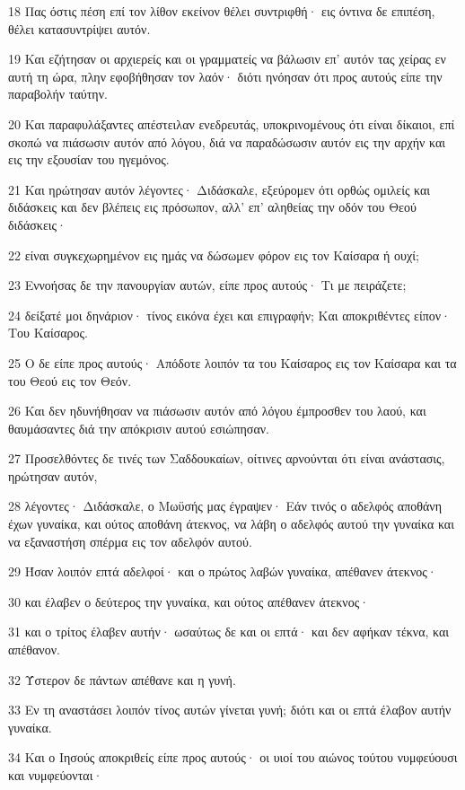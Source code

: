 \par 18 Πας όστις πέση επί τον λίθον εκείνον θέλει συντριφθή· εις όντινα δε επιπέση, θέλει κατασυντρίψει αυτόν.
\par 19 Και εζήτησαν οι αρχιερείς και οι γραμματείς να βάλωσιν επ' αυτόν τας χείρας εν αυτή τη ώρα, πλην εφοβήθησαν τον λαόν· διότι ηνόησαν ότι προς αυτούς είπε την παραβολήν ταύτην.
\par 20 Και παραφυλάξαντες απέστειλαν ενεδρευτάς, υποκρινομένους ότι είναι δίκαιοι, επί σκοπώ να πιάσωσιν αυτόν από λόγου, διά να παραδώσωσιν αυτόν εις την αρχήν και εις την εξουσίαν του ηγεμόνος.
\par 21 Και ηρώτησαν αυτόν λέγοντες· Διδάσκαλε, εξεύρομεν ότι ορθώς ομιλείς και διδάσκεις και δεν βλέπεις εις πρόσωπον, αλλ' επ' αληθείας την οδόν του Θεού διδάσκεις·
\par 22 είναι συγκεχωρημένον εις ημάς να δώσωμεν φόρον εις τον Καίσαρα ή ουχί;
\par 23 Εννοήσας δε την πανουργίαν αυτών, είπε προς αυτούς· Τι με πειράζετε;
\par 24 δείξατέ μοι δηνάριον· τίνος εικόνα έχει και επιγραφήν; Και αποκριθέντες είπον· Του Καίσαρος.
\par 25 Ο δε είπε προς αυτούς· Απόδοτε λοιπόν τα του Καίσαρος εις τον Καίσαρα και τα του Θεού εις τον Θεόν.
\par 26 Και δεν ηδυνήθησαν να πιάσωσιν αυτόν από λόγου έμπροσθεν του λαού, και θαυμάσαντες διά την απόκρισιν αυτού εσιώπησαν.
\par 27 Προσελθόντες δε τινές των Σαδδουκαίων, οίτινες αρνούνται ότι είναι ανάστασις, ηρώτησαν αυτόν,
\par 28 λέγοντες· Διδάσκαλε, ο Μωϋσής μας έγραψεν· Εάν τινός ο αδελφός αποθάνη έχων γυναίκα, και ούτος αποθάνη άτεκνος, να λάβη ο αδελφός αυτού την γυναίκα και να εξαναστήση σπέρμα εις τον αδελφόν αυτού.
\par 29 Ήσαν λοιπόν επτά αδελφοί· και ο πρώτος λαβών γυναίκα, απέθανεν άτεκνος·
\par 30 και έλαβεν ο δεύτερος την γυναίκα, και ούτος απέθανεν άτεκνος·
\par 31 και ο τρίτος έλαβεν αυτήν· ωσαύτως δε και οι επτά· και δεν αφήκαν τέκνα, και απέθανον.
\par 32 Ύστερον δε πάντων απέθανε και η γυνή.
\par 33 Εν τη αναστάσει λοιπόν τίνος αυτών γίνεται γυνή; διότι και οι επτά έλαβον αυτήν γυναίκα.
\par 34 Και ο Ιησούς αποκριθείς είπε προς αυτούς· οι υιοί του αιώνος τούτου νυμφεύουσι και νυμφεύονται·

